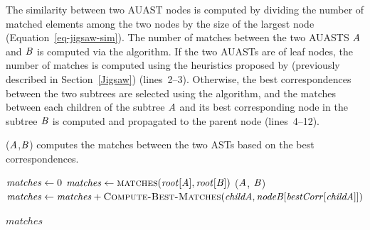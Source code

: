 


The similarity between two AUAST nodes is computed by dividing the number of matched elements among the two nodes by the size of the largest node (Equation~\ref{eq-jigsaw-sim}). The number of matches between the two AUASTS $\mathit{A}$ and $\mathit{B}$ is computed via the  algorithm. If the two AUASTs are of leaf nodes, the number of matches is computed using the heuristics proposed by \citet{2008:fse:cottrell} (previously described in Section~\ref{Jigsaw}) (lines~2--3). Otherwise, the best correspondences between the two subtrees are selected using the  algorithm, and the matches between each children of the subtree $\mathit{A}$ and its best corresponding node in the subtree $\mathit{B}$ is computed and propagated to the parent node (lines~4--12).


\begin{algorithm}
 \caption{($\mathit{A}$,$\mathit{B}$) computes the matches between the two ASTs based on the best correspondences.}
  \label{simi}
  \begin{algorithmic}[1]
  \ComputeBestMatches
  \State $\mathit{matches} \gets 0$
  \State $\mathit{matches} \gets   \textsc{matches}(\mathit{root}[\mathit{A}],\mathit{root}[\mathit{B}])$
    	\State {}($\mathit{A}$, $\mathit{B}$)
 		\State $\mathit{matches} \gets \mathit{matches}+\textsc{Compute-Best-Matches}(\mathit{childA},\mathit{nodeB}[\mathit{bestCorr}[\mathit{childA}]])$		 
 \EndIf
 \EndFor

 \EndIf
 \Return $matches$
\end{algorithmic}
\end{algorithm}






